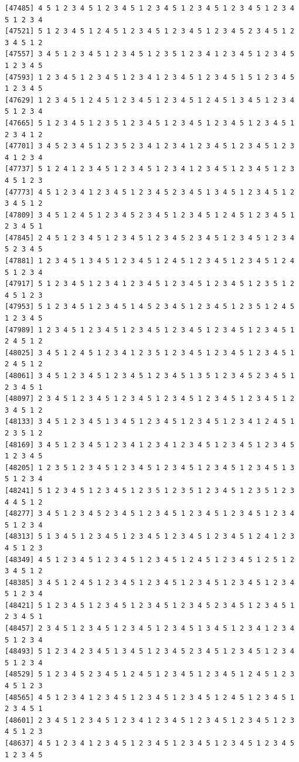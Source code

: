 \documentclass[
  english,
]{book}
\begin{document}
\begin{verbatim}
[47485] 4 5 1 2 3 4 5 1 2 3 4 5 1 2 3 4 5 1 2 3 4 5 1 2 3 4 5 1 2 3 4 5 1 2 3 4
[47521] 5 1 2 3 4 5 1 2 4 5 1 2 3 4 5 1 2 3 4 5 1 2 3 4 5 2 3 4 5 1 2 3 4 5 1 2
[47557] 3 4 5 1 2 3 4 5 1 2 3 4 5 1 2 3 5 1 2 3 4 1 2 3 4 5 1 2 3 4 5 1 2 3 4 5
[47593] 1 2 3 4 5 1 2 3 4 5 1 2 3 4 1 2 3 4 5 1 2 3 4 5 1 5 1 2 3 4 5 1 2 3 4 5
[47629] 1 2 3 4 5 1 2 4 5 1 2 3 4 5 1 2 3 4 5 1 2 4 5 1 3 4 5 1 2 3 4 5 1 2 3 4
[47665] 5 1 2 3 4 5 1 2 3 5 1 2 3 4 5 1 2 3 4 5 1 2 3 4 5 1 2 3 4 5 1 2 3 4 1 2
[47701] 3 4 5 2 3 4 5 1 2 3 5 2 3 4 1 2 3 4 1 2 3 4 5 1 2 3 4 5 1 2 3 4 1 2 3 4
[47737] 5 1 2 4 1 2 3 4 5 1 2 3 4 5 1 2 3 4 1 2 3 4 5 1 2 3 4 5 1 2 3 4 5 1 2 3
[47773] 4 5 1 2 3 4 1 2 3 4 5 1 2 3 4 5 2 3 4 5 1 3 4 5 1 2 3 4 5 1 2 3 4 5 1 2
[47809] 3 4 5 1 2 4 5 1 2 3 4 5 2 3 4 5 1 2 3 4 5 1 2 4 5 1 2 3 4 5 1 2 3 4 5 1
[47845] 2 4 5 1 2 3 4 5 1 2 3 4 5 1 2 3 4 5 2 3 4 5 1 2 3 4 5 1 2 3 4 5 2 3 4 5
[47881] 1 2 3 4 5 1 3 4 5 1 2 3 4 5 1 2 4 5 1 2 3 4 5 1 2 3 4 5 1 2 4 5 1 2 3 4
[47917] 5 1 2 3 4 5 1 2 3 4 1 2 3 4 5 1 2 3 4 5 1 2 3 4 5 1 2 3 5 1 2 4 5 1 2 3
[47953] 5 1 2 3 4 5 1 2 3 4 5 1 4 5 2 3 4 5 1 2 3 4 5 1 2 3 5 1 2 4 5 1 2 3 4 5
[47989] 1 2 3 4 5 1 2 3 4 5 1 2 3 4 5 1 2 3 4 5 1 2 3 4 5 1 2 3 4 5 1 2 4 5 1 2
[48025] 3 4 5 1 2 4 5 1 2 3 4 1 2 3 5 1 2 3 4 5 1 2 3 4 5 1 2 3 4 5 1 2 4 5 1 2
[48061] 3 4 5 1 2 3 4 5 1 2 3 4 5 1 2 3 4 5 1 3 5 1 2 3 4 5 2 3 4 5 1 2 3 4 5 1
[48097] 2 3 4 5 1 2 3 4 5 1 2 3 4 5 1 2 3 4 5 1 2 3 4 5 1 2 3 4 5 1 2 3 4 5 1 2
[48133] 3 4 5 1 2 3 4 5 1 3 4 5 1 2 3 4 5 1 2 3 4 5 1 2 3 4 1 2 4 5 1 2 3 5 1 2
[48169] 3 4 5 1 2 3 4 5 1 2 3 4 1 2 3 4 1 2 3 4 5 1 2 3 4 5 1 2 3 4 5 1 2 3 4 5
[48205] 1 2 3 5 1 2 3 4 5 1 2 3 4 5 1 2 3 4 5 1 2 3 4 5 1 2 3 4 5 1 3 5 1 2 3 4
[48241] 5 1 2 3 4 5 1 2 3 4 5 1 2 3 5 1 2 3 5 1 2 3 4 5 1 2 3 5 1 2 3 4 4 5 1 2
[48277] 3 4 5 1 2 3 4 5 2 3 4 5 1 2 3 4 5 1 2 3 4 5 1 2 3 4 5 1 2 3 4 5 1 2 3 4
[48313] 5 1 3 4 5 1 2 3 4 5 1 2 3 4 5 1 2 3 4 5 1 2 3 4 5 1 2 4 1 2 3 4 5 1 2 3
[48349] 4 5 1 2 3 4 5 1 2 3 4 5 1 2 3 4 5 1 2 4 5 1 2 3 4 5 1 2 5 1 2 3 4 5 1 2
[48385] 3 4 5 1 2 4 5 1 2 3 4 5 1 2 3 4 5 1 2 3 4 5 1 2 3 4 5 1 2 3 4 5 1 2 3 4
[48421] 5 1 2 3 4 5 1 2 3 4 5 1 2 3 4 5 1 2 3 4 5 2 3 4 5 1 2 3 4 5 1 2 3 4 5 1
[48457] 2 3 4 5 1 2 3 4 5 1 2 3 4 5 1 2 3 4 5 1 3 4 5 1 2 3 4 1 2 3 4 5 1 2 3 4
[48493] 5 1 2 3 4 2 3 4 5 1 3 4 5 1 2 3 4 5 2 3 4 5 1 2 3 4 5 1 2 3 4 5 1 2 3 4
[48529] 5 1 2 3 4 5 2 3 4 5 1 2 4 5 1 2 3 4 5 1 2 3 4 5 1 2 4 5 1 2 3 4 5 1 2 3
[48565] 4 5 1 2 3 4 1 2 3 4 5 1 2 3 4 5 1 2 3 4 5 1 2 4 5 1 2 3 4 5 1 2 3 4 5 1
[48601] 2 3 4 5 1 2 3 4 5 1 2 3 4 1 2 3 4 5 1 2 3 4 5 1 2 3 4 5 1 2 3 4 5 1 2 3
[48637] 4 5 1 2 3 4 1 2 3 4 5 1 2 3 4 5 1 2 3 4 5 1 2 3 4 5 1 2 3 4 5 1 2 3 4 5

\end{verbatim}
\end{document}
